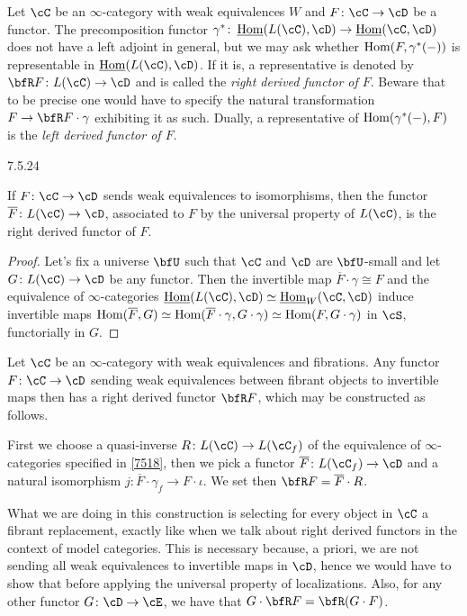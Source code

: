 \documentclass[a4paper,12pt]{scrartcl}
\begin{document}
\begin{rmk}
  Let $\cC$ be an $\infty$-category with weak equivalences $W$ and
  $F\colon\cC\rightarrow\cD$ be a functor. The precomposition functor
  $\gamma^*\colon\Home(L(\cC),\cD)\rightarrow\Home(\cC,\cD)$ does not have a
  left adjoint in general, but we may ask whether $\operatorname{Hom}(F,\gamma^*(-))$ is
  representable in $\Home(L(\cC),\cD)$. If it is, a representative is denoted by
  $\bfR F\colon L(\cC)\rightarrow\cD$ and is called the \emph{right derived
  functor of $F$}. Beware that to be precise one would have to specify the
  natural transformation $F\rightarrow\bfR F\cdot\gamma$ exhibiting it as such.
  Dually, a representative of $\operatorname{Hom}(\gamma^*(-),F)$ is the \emph{left derived
  functor of $F$}.
\end{rmk}

\begin{prop}\label{7524}
  7.5.24

  If $F\colon\cC\rightarrow\cD$ sends weak equivalences to isomorphisms, then
  the functor $\overline{F}\colon L(\cC)\rightarrow\cD$, associated to $F$ by
  the universal property of $L(\cC)$, is the right derived functor of $F$.
\end{prop}
\begin{proof}
  Let's fix a universe $\bfU$ such that $\cC$ and $\cD$ are $\bfU$-small and let
  $G\colon L(\cC)\rightarrow\cD$ be any functor. Then the invertible map
  $\overline{F}\cdot\gamma\cong F$ and the equivalence of $\infty$-categories
  $\Home(L(\cC),\cD)\simeq\Home_W(\cC,\cD)$ induce invertible maps
  $\operatorname{Hom}(\overline{F},G)\simeq\operatorname{Hom}(\overline{F}\cdot\gamma,G\cdot\gamma)\simeq\operatorname{Hom}(F,G\cdot\gamma)$
  in $\cS$, functorially in $G$.
\end{proof}

\begin{construction}\label{7525}

  Let $\cC$ be an $\infty$-category with weak equivalences and fibrations. Any
  functor $F\colon\cC\rightarrow\cD$ sending weak equivalences between fibrant
  objects to invertible maps then has a right derived functor $\bfR F$, which
  may be constructed as follows.

  First we choose a quasi-inverse $R\colon L(\cC)\rightarrow L(\cC_f)$ of the
  equivalence of $\infty$-categories specified in \ref{7518}, then we pick a
  functor $\overline{F}\colon L(\cC_f)\rightarrow\cD$ and a natural isomorphism
  $j\colon\overline{F}\cdot\gamma_f\rightarrow F\cdot\iota$. We set then $\bfR
  F=\overline{F}\cdot R$.

  What we are doing in this construction is selecting
  for every object in $\cC$ a fibrant replacement, exactly like when we talk
  about right derived functors in the context of model categories. This is
  necessary because, a priori, we are not sending all weak equivalences to
  invertible maps in $\cD$, hence we would have to show that before applying the
  universal property of localizations. Also, for any
  other functor $G\colon\cD\rightarrow\cE$, we have that $G\cdot\bfR
  F=\bfR(G\cdot F)$.
\end{construction}
\end{document}
